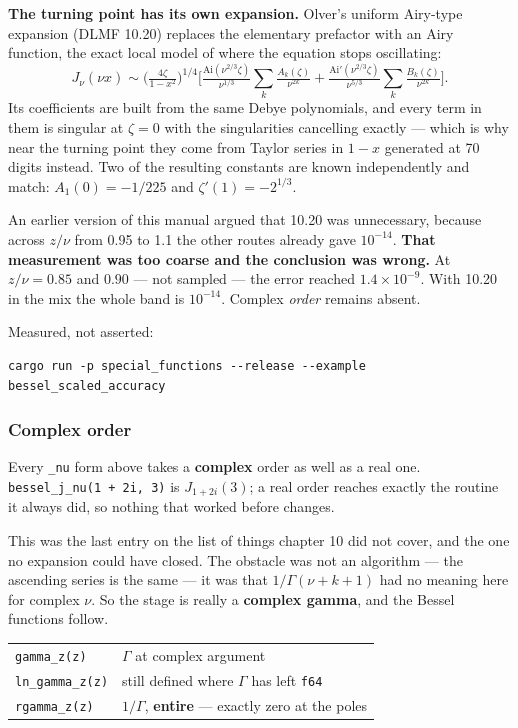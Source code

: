 \documentclass[11pt]{article}
\newcommand{\code}[1]{\texttt{#1}}
\begin{document}
\textbf{The turning point has its own expansion.} Olver's uniform
Airy-type expansion (DLMF 10.20) replaces the elementary prefactor with
an Airy function, the exact local model of where the equation stops
oscillating:
\[
  J_\nu(\nu x) \sim \Big(\tfrac{4\zeta}{1-x^2}\Big)^{1/4}
    \Big[\tfrac{\mathrm{Ai}(\nu^{2/3}\zeta)}{\nu^{1/3}}
        \sum_k \tfrac{A_k(\zeta)}{\nu^{2k}}
      + \tfrac{\mathrm{Ai}'(\nu^{2/3}\zeta)}{\nu^{5/3}}
        \sum_k \tfrac{B_k(\zeta)}{\nu^{2k}}\Big].
\]
Its coefficients are built from the same Debye polynomials, and every
term in them is singular at $\zeta = 0$ with the singularities
cancelling exactly --- which is why near the turning point they come
from Taylor series in $1-x$ generated at 70 digits instead. Two of the
resulting constants are known independently and match:
$A_1(0) = -1/225$ and $\zeta'(1) = -2^{1/3}$.

An earlier version of this manual argued that 10.20 was unnecessary,
because across $z/\nu$ from 0.95 to 1.1 the other routes already gave
$10^{-14}$. \textbf{That measurement was too coarse and the conclusion
was wrong.} At $z/\nu = 0.85$ and $0.90$ --- not sampled --- the error
reached $1.4\times10^{-9}$. With 10.20 in the mix the whole band is
$10^{-14}$. Complex \emph{order} remains absent.

Measured, not asserted:
\begin{lstlisting}
cargo run -p special_functions --release --example bessel_scaled_accuracy
\end{lstlisting}

\subsubsection*{Complex order}

Every \code{\_nu} form above takes a \textbf{complex} order as well as a
real one. \code{bessel\_j\_nu(1 + 2i, 3)} is $J_{1+2i}(3)$; a real order
reaches exactly the routine it always did, so nothing that worked before
changes.

This was the last entry on the list of things chapter 10 did not cover,
and the one no expansion could have closed. The obstacle was not an
algorithm --- the ascending series is the same --- it was that
$1/\Gamma(\nu+k+1)$ had no meaning here for complex $\nu$. So the stage
is really a \textbf{complex gamma}, and the Bessel functions follow.

\begin{center}
\begin{tabular}{lp{7.4cm}}
\code{gamma\_z(z)} & $\Gamma$ at complex argument\\
\code{ln\_gamma\_z(z)} & still defined where $\Gamma$ has left \code{f64}\\
\code{rgamma\_z(z)} & $1/\Gamma$, \textbf{entire} --- exactly zero at the poles\\
\end{tabular}
\end{center}
\end{document}
